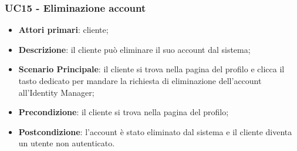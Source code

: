 \subsubsection{UC15 - Eliminazione account}
\begin{itemize}
\item \textbf{Attori primari}: cliente;
\item \textbf{Descrizione}: il cliente può eliminare il suo account dal sistema;
\item \textbf{Scenario Principale}: il cliente si trova nella pagina del profilo e clicca il tasto dedicato per mandare la richiesta di eliminazione dell'account all'Identity Manager;
\item \textbf{Precondizione}: il cliente si trova nella pagina del profilo;
\item \textbf{Postcondizione}: l'account è stato eliminato dal sistema e il cliente diventa un utente non autenticato.
\end{itemize}
